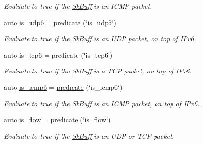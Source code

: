 \begin{DoxyCompactItemize}
\begin{DoxyCompactList}\small\item\em Evaluate to {\ttfamily true} if the \hyperlink{structpfq_1_1lang_1_1SkBuff}{Sk\+Buff} is an I\+C\+MP packet. \end{DoxyCompactList}\item 
auto \hyperlink{namespacepfq_1_1lang_1_1anonymous__namespace_02default_8hpp_03_a8f3f79760f7be2ce30db5025bff887a6}{is\+\_\+udp6} = \hyperlink{namespacepfq_1_1lang_aca9adafc436b7f851621b979fa1aaf88}{predicate} (\char`\"{}is\+\_\+udp6\char`\"{})
\begin{DoxyCompactList}\small\item\em Evaluate to {\ttfamily true} if the \hyperlink{structpfq_1_1lang_1_1SkBuff}{Sk\+Buff} is an U\+DP packet, on top of I\+Pv6. \end{DoxyCompactList}\item 
auto \hyperlink{namespacepfq_1_1lang_1_1anonymous__namespace_02default_8hpp_03_a56d9bafc51ca6775da4ec3b816b1c7bb}{is\+\_\+tcp6} = \hyperlink{namespacepfq_1_1lang_aca9adafc436b7f851621b979fa1aaf88}{predicate} (\char`\"{}is\+\_\+tcp6\char`\"{})
\begin{DoxyCompactList}\small\item\em Evaluate to {\ttfamily true} if the \hyperlink{structpfq_1_1lang_1_1SkBuff}{Sk\+Buff} is a T\+CP packet, on top of I\+Pv6. \end{DoxyCompactList}\item 
auto \hyperlink{namespacepfq_1_1lang_1_1anonymous__namespace_02default_8hpp_03_a01d6e9764945cc33a11f3ce6a9925549}{is\+\_\+icmp6} = \hyperlink{namespacepfq_1_1lang_aca9adafc436b7f851621b979fa1aaf88}{predicate} (\char`\"{}is\+\_\+icmp6\char`\"{})
\begin{DoxyCompactList}\small\item\em Evaluate to {\ttfamily true} if the \hyperlink{structpfq_1_1lang_1_1SkBuff}{Sk\+Buff} is an I\+C\+MP packet, on top of I\+Pv6. \end{DoxyCompactList}\item 
auto \hyperlink{namespacepfq_1_1lang_1_1anonymous__namespace_02default_8hpp_03_ae52890434121a999589d48bccae3c3e2}{is\+\_\+flow} = \hyperlink{namespacepfq_1_1lang_aca9adafc436b7f851621b979fa1aaf88}{predicate} (\char`\"{}is\+\_\+flow\char`\"{})
\begin{DoxyCompactList}\small\item\em Evaluate to {\ttfamily true} if the \hyperlink{structpfq_1_1lang_1_1SkBuff}{Sk\+Buff} is an U\+DP or T\+CP packet. \end{DoxyCompactList}\item 

\end{DoxyCompactItemize}
